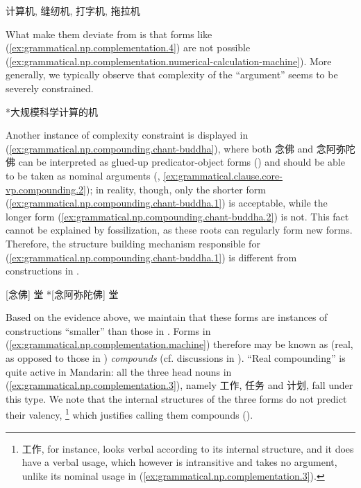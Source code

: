 \documentclass[UTF8, a4paper, oneside, scheme=plain, 12pt]{ctexrep}
\newcommand*{\term}[1]{\emph{#1}}
\begin{document}
\begin{exe}
    \ex\label{ex:grammatical.np.complementation.machine}  计算机, 缝纫机, 打字机, 拖拉机
\end{exe}

What make them deviate from  is that forms like (\ref{ex:grammatical.np.complementation.4}) are not possible
(\ref{ex:grammatical.np.complementation.numerical-calculation-machine}).
More generally, we typically observe that complexity of the ``argument'' seems to be severely constrained.

\begin{exe}
    \ex\label{ex:grammatical.np.complementation.numerical-calculation-machine} *大规模科学计算的机
\end{exe}

Another instance of complexity constraint 
is displayed in (\ref{ex:grammatical.np.compounding.chant-buddha}),
where both 念佛 and 念阿弥陀佛 can be interpreted as glued-up predicator-object forms ()
and should be able to be taken as nominal arguments
(, \ref{ex:grammatical.clause.core-vp.compounding.2});
in reality, though, only the shorter form (\ref{ex:grammatical.np.compounding.chant-buddha.1}) is acceptable,
while the longer form (\ref{ex:grammatical.np.compounding.chant-buddha.2}) is not.
This fact cannot be explained by fossilization,
as these roots can regularly form new forms.
Therefore, the structure building mechanism responsible for (\ref{ex:grammatical.np.compounding.chant-buddha.1})
is different from constructions in .

\begin{exe}
    \ex\label{ex:grammatical.np.compounding.chant-buddha}
    \begin{xlist}
        \ex\label{ex:grammatical.np.compounding.chant-buddha.1} {} [念佛] 堂 
        \ex\label{ex:grammatical.np.compounding.chant-buddha.2} {} *[念阿弥陀佛] 堂 
    \end{xlist}
\end{exe}

Based on the evidence above, we maintain that these forms are instances
of constructions ``smaller'' than those in .
Forms in (\ref{ex:grammatical.np.complementation.machine})
therefore may be known as (real, as opposed to those in ) \term{compounds}
(cf. discussions in ).
``Real compounding'' is quite active in Mandarin:
all the three head nouns in (\ref{ex:grammatical.np.complementation.3}),
namely 工作, 任务 and 计划, fall under this type.
We note that the internal structures of the three forms do not predict their valency,%
\footnote{
    工作, for instance, looks verbal according to its internal structure,
    and it does have a verbal usage, which however is intransitive
    and takes no argument, unlike its nominal usage in (\ref{ex:grammatical.np.complementation.3}).
}
which justifies calling them compounds ().
\end{document}
